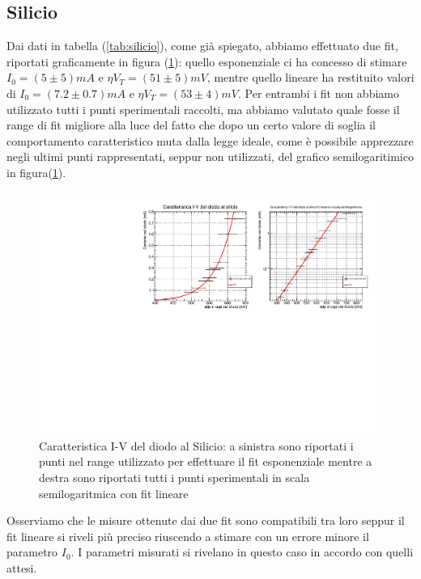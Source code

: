 \documentclass[]{article}
\begin{document}
\subsection{Silicio}
Dai dati in tabella (\ref{tab:silicio}), come già spiegato, abbiamo effettuato due fit, riportati graficamente in figura (\ref{fig:silicio}): quello esponenziale ci ha concesso di stimare $I_0=(5\pm5)mA$ e $\eta V_T=(51\pm5)mV$, mentre quello lineare ha restituito valori di $I_0=(7.2\pm0.7)mA$ e $\eta V_T=(53\pm4)mV$. Per entrambi i fit non abbiamo utilizzato tutti i punti sperimentali raccolti, ma abbiamo valutato quale fosse il range di fit migliore alla luce del fatto che dopo un certo valore di soglia il comportamento caratteristico muta dalla legge ideale, come è possibile apprezzare negli ultimi punti rappresentati, seppur non utilizzati, del grafico semilogaritimico in figura(\ref{fig:silicio}). 
\begin{figure}[H]
	\centering
	\includegraphics[width=0.9\linewidth]{../Silicio/canvas}
	\caption{Caratteristica I-V del diodo al Silicio: a sinistra sono riportati i punti nel range utilizzato per effettuare il fit esponenziale mentre a destra sono riportati tutti i punti sperimentali in scala semilogaritmica con fit lineare}
	\label{fig:silicio}
\end{figure}
Osserviamo che le misure ottenute dai due fit sono compatibili tra loro seppur il fit lineare si riveli più preciso riuscendo a stimare con un errore minore il parametro $I_0$.
I parametri misurati si rivelano in questo caso in accordo con quelli attesi.
\end{document}
